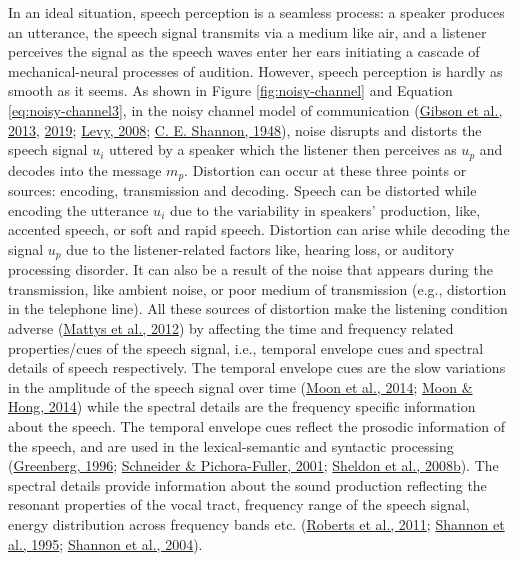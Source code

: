 \documentclass[a4paper, nobind]{templates/ociamthesis}
\begin{document}
In an ideal situation, speech perception is a seamless process: a speaker produces an utterance, the speech signal transmits via a medium like air, and a listener perceives the signal as the speech waves enter her ears initiating a cascade of mechanical-neural processes of audition.
However, speech perception is hardly as smooth as it seems.
As shown in Figure \ref{fig:noisy-channel} and Equation \eqref{eq:noisy-channel3}, in the noisy channel model of communication (\protect\hyperlink{ref-Gibson2013}{Gibson et al., 2013}, \protect\hyperlink{ref-Gibson2019}{2019}; \protect\hyperlink{ref-Levy2008}{Levy, 2008}; \protect\hyperlink{ref-Shannon1948}{C. E. Shannon, 1948}),
noise disrupts and distorts the speech signal \(u_i\) uttered by a speaker
which the listener then perceives as \(u_p\) and decodes into the message \(m_p\).
Distortion can occur at these three points or sources: encoding, transmission and decoding.
Speech can be distorted while encoding the utterance \(u_i\) due to the variability in speakers' production, like, accented speech, or soft and rapid speech.
Distortion can arise while decoding the signal \(u_p\) due to the listener-related factors like, hearing loss, or auditory processing disorder.
It can also be a result of the noise that appears during the transmission, like ambient noise, or poor medium of transmission (e.g., distortion in the telephone line).
All these sources of distortion make the listening condition adverse (\protect\hyperlink{ref-Mattys2012}{Mattys et al., 2012}) by affecting the time and frequency related properties/cues of the speech signal, i.e., temporal envelope cues and spectral details of speech respectively.
The temporal envelope cues are the slow variations in the amplitude of the speech signal over time (\protect\hyperlink{ref-Moon2014}{Moon et al., 2014}; \protect\hyperlink{ref-Moon2014a}{Moon \& Hong, 2014}) while the spectral details are the frequency specific information about the speech.
The temporal envelope cues reflect the prosodic information of the speech, and are used in the lexical-semantic and syntactic processing (\protect\hyperlink{ref-Greenberg1996}{Greenberg, 1996}; \protect\hyperlink{ref-Schneider2001}{Schneider \& Pichora-Fuller, 2001}; \protect\hyperlink{ref-Sheldon2008b}{Sheldon et al., 2008b}).
The spectral details provide information about the sound production reflecting the resonant properties of the vocal tract, frequency range of the speech signal, energy distribution across frequency bands etc. (\protect\hyperlink{ref-Roberts2011}{Roberts et al., 2011}; \protect\hyperlink{ref-Shannon1995}{Shannon et al., 1995}; \protect\hyperlink{ref-Shannon2004}{Shannon et al., 2004}).
\end{document}

